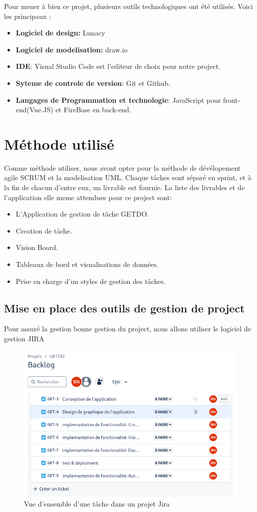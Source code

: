 \documentclass[a4paper,12pt]{report}
\begin{document}
Pour mener à bien ce projet, plusieurs outils technologiques ont été utilisés. Voici les principaux :
\begin{itemize}
  \item\textbf{Logiciel de design:} Lunacy
  \item\textbf{Logiciel de modelisation:} draw.io
  \item\textbf{IDE}: Visual Studio Code est l'editeur de choix pour notre project.
  \item\textbf{Syteme de controle de version}: Git et Github.
  \item\textbf{Langages de Programmation et technologie}: JavaScript pour front-end(Vue.JS) et FireBase en back-end.
\end{itemize}

\section{Méthode utilisé}
Comme méthode utiliser, nous avont opter pour la méthode de dévélopement agile SCRUM et la modelisation UML. Chaque tâches sont séparé en sprint, et à la fin de chacun d'entre eux, un livrable est fournie. La liste des livrables et de l'application elle meme attendues pour ce project sont:
\begin{itemize}
  \item L'Application de gestion de tâche GETDO.
  \item Creation de tâche.
  \item Vision Board.
  \item Tableaux de bord et visualisations de données.
  \item Prise en charge d'un styles de gestion des tâches.
\end{itemize}

\subsection{Mise en place des outils de gestion de project}
Pour assuré la gestion bonne gestion du project, nous allons utiliser le logiciel de gestion JIRA

\begin{figure}[h!]
    \includegraphics[width=1\textwidth]{./images/jira_project_task.png}
    \caption{Vue d'ensemble d'une tâche dans un projet Jira}
    \label{fig:jira_project_task}
\end{figure}
\end{document}
